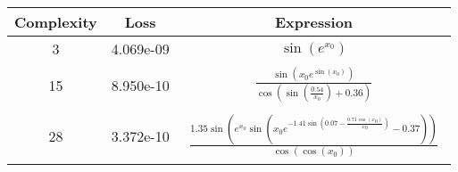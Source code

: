 \begin{center}
        \begin{tabular}{|c|c|c|}
        \hline
        Complexity & Loss & Expression \\
        \hline
        3 & 4.069e-09 & $\begin{aligned}\sin{\left(e^{x_{0}} \right)}\end{aligned}$\\ \hline15 & 8.950e-10 & $\begin{aligned}\frac{\sin{\left(x_{0} e^{\sin{\left(x_{0} \right)}} \right)}}{\cos{\left(\sin{\left(\frac{0.54}{x_{0}} \right)} + 0.36 \right)}}\end{aligned}$\\ \hline28 & 3.372e-10 & $\begin{aligned}\frac{1.35 \sin{\left(e^{x_{0}} \sin{\left(x_{0} e^{- 1.41 \sin{\left(0.07 - \frac{0.71 \cos{\left(x_{0} \right)}}{x_{0}} \right)}} - 0.37 \right)} \right)}}{\cos{\left(\cos{\left(x_{0} \right)} \right)}}\end{aligned}$\\ \hline\end{tabular}
        \end{center}
        